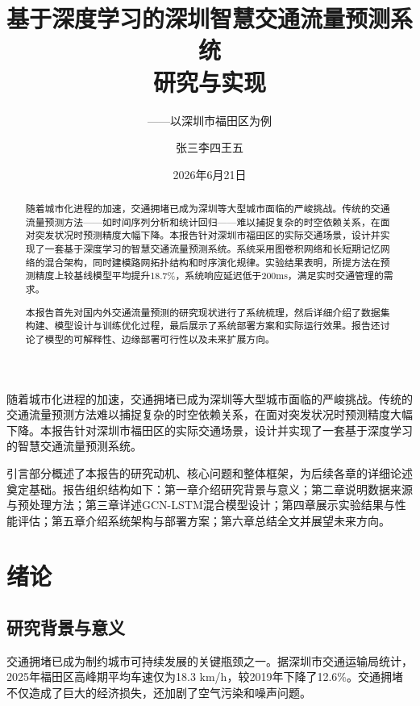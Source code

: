 \documentclass{harryopo-report}
\title{基于深度学习的深圳智慧交通流量预测系统\\研究与实现}
\subtitle{——以深圳市福田区为例}
\author{张三\quad 李四\quad 王五}
\institute{计算机学院}
\date{2026年6月21日}
\begin{document}
\maketitle

\begin{abstract}
随着城市化进程的加速，交通拥堵已成为深圳等大型城市面临的严峻挑战。传统的交通流量预测方法——如时间序列分析和统计回归——难以捕捉复杂的时空依赖关系，在面对突发状况时预测精度大幅下降。本报告针对深圳市福田区的实际交通场景，设计并实现了一套基于深度学习的智慧交通流量预测系统。系统采用图卷积网络和长短期记忆网络的混合架构，同时建模路网拓扑结构和时序演化规律。实验结果表明，所提方法在预测精度上较基线模型平均提升18.7\%，系统响应延迟低于200ms，满足实时交通管理的需求。

本报告首先对国内外交通流量预测的研究现状进行了系统梳理，然后详细介绍了数据集构建、模型设计与训练优化过程，最后展示了系统部署方案和实际运行效果。报告还讨论了模型的可解释性、边缘部署可行性以及未来扩展方向。
\end{abstract}

\tableofcontents

\introduction

随着城市化进程的加速，交通拥堵已成为深圳等大型城市面临的严峻挑战。传统的交通流量预测方法难以捕捉复杂的时空依赖关系，在面对突发状况时预测精度大幅下降。本报告针对深圳市福田区的实际交通场景，设计并实现了一套基于深度学习的智慧交通流量预测系统。

引言部分概述了本报告的研究动机、核心问题和整体框架，为后续各章的详细论述奠定基础。报告组织结构如下：第一章介绍研究背景与意义；第二章说明数据来源与预处理方法；第三章详述GCN-LSTM混合模型设计；第四章展示实验结果与性能评估；第五章介绍系统架构与部署方案；第六章总结全文并展望未来方向。

\chapter{绪论}

\section{研究背景与意义}

交通拥堵已成为制约城市可持续发展的关键瓶颈之一。据深圳市交通运输局统计，2025年福田区高峰期平均车速仅为18.3 km/h，较2019年下降了12.6\%。交通拥堵不仅造成了巨大的经济损失，还加剧了空气污染和噪声问题。
\end{document}
